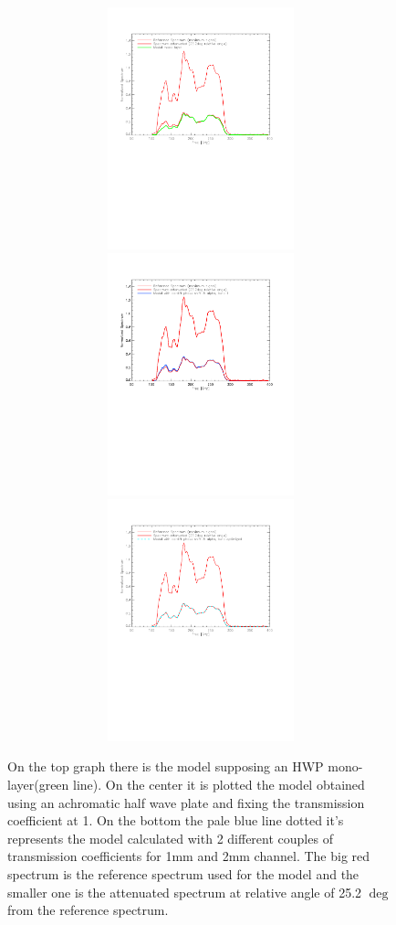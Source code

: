 \documentclass[a4paper,10pt]{article}
\begin{document}
\begin{figure}
	\centering
	\includegraphics[height=7cm, width=16cm, trim=0cm 8cm 0cm 2cm, clip=true]{figures/Spectrum_HWP_mono}
	\hspace{2mm}
	\includegraphics[height=7cm,width=16cm, trim=0cm 8cm 0cm 2cm, clip=true]{figures/Spectrum_HWP_fixed}
	\includegraphics[height=7cm,width=16cm, trim=0cm 8cm 0cm 2cm, clip=true]{figures/Spectrum_HWP_optimized}
	
	\caption{On the top graph there is the model supposing an HWP mono-layer(green line). On the center it is plotted the model obtained using an achromatic half wave plate and fixing the transmission coefficient at 1. On the bottom the pale blue line dotted it's represents the model calculated with 2 different couples of transmission coefficients for 1mm and 2mm channel. The big red spectrum is the reference spectrum used for the model and the smaller one is the attenuated spectrum at relative angle of 25.2 {$\deg$} from the reference spectrum. }
	\label{fig:Spectra}
\end{figure}
\end{document}
